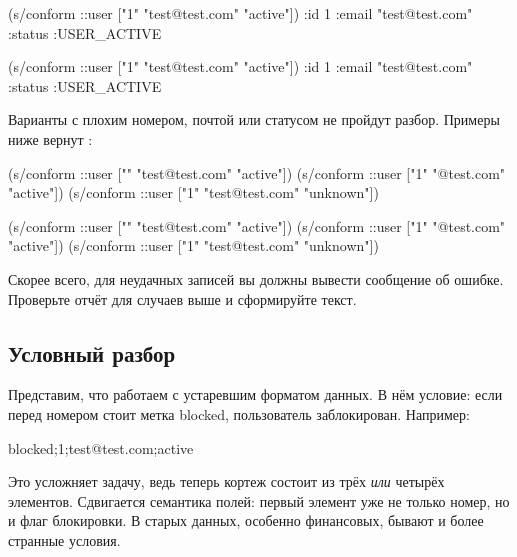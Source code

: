 \ifnarrow


\begin{clojure}
(s/conform ::user
  ["1" "test@test.com" "active"])
{:id 1
 :email "test@test.com"
 :status :USER_ACTIVE}
\end{clojure}


\else


\begin{clojure}
(s/conform ::user ["1" "test@test.com" "active"])
{:id 1
 :email "test@test.com"
 :status :USER_ACTIVE}
\end{clojure}


\fi

Варианты с плохим номером, почтой или статусом не пройдут разбор. Примеры ниже
вернут :

\ifnarrow


\begin{clojure}
(s/conform ::user
  ["" "test@test.com" "active"])
(s/conform ::user
  ["1" "@test.com" "active"])
(s/conform ::user
  ["1" "test@test.com" "unknown"])
\end{clojure}


\else


\begin{clojure}
(s/conform ::user ["" "test@test.com" "active"])
(s/conform ::user ["1" "@test.com" "active"])
(s/conform ::user ["1" "test@test.com" "unknown"])
\end{clojure}


\fi

Скорее всего, для неудачных записей вы должны вывести сообщение об
ошибке. Проверьте отчёт  для случаев выше и сформируйте текст.

\subsection{Условный разбор}

Представим, что работаем с устаревшим форматом данных. В нём условие: если
перед номером стоит метка blocked, пользователь заблокирован. Например:


\begin{text}
blocked;1;test@test.com;active
\end{text}


Это усложняет задачу, ведь теперь кортеж состоит из трёх \emph{или} четырёх
элементов. Сдвигается семантика полей: первый элемент уже не только номер, но и
флаг блокировки. В старых данных, особенно финансовых, бывают и более странные
условия.


